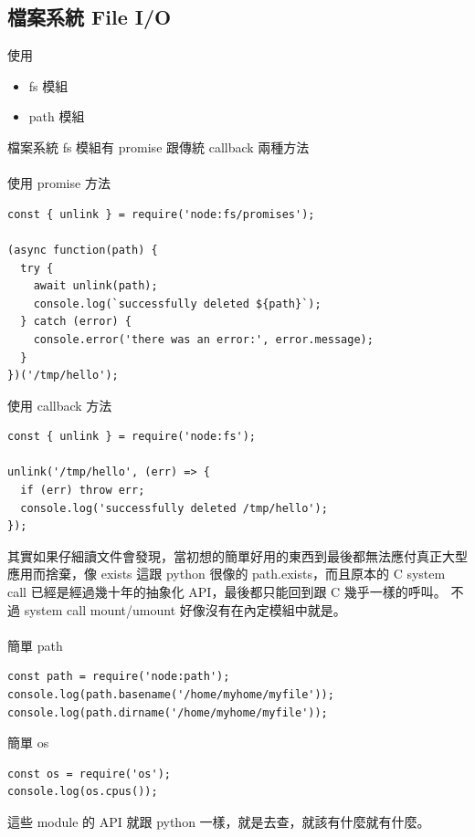   \subsection{檔案系統 File I/O}
  使用
  \begin{itemize}
    \item fs 模組
    \item path 模組
  \end{itemize}
  檔案系統 fs 模組有 promise 跟傳統 callback 兩種方法
  \\\\
  使用 promise 方法
  \begin{verbatim}
const { unlink } = require('node:fs/promises');

(async function(path) {
  try {
    await unlink(path);
    console.log(`successfully deleted ${path}`);
  } catch (error) {
    console.error('there was an error:', error.message);
  }
})('/tmp/hello');
  \end{verbatim}
  使用 callback 方法
  \begin{verbatim}
const { unlink } = require('node:fs');

unlink('/tmp/hello', (err) => {
  if (err) throw err;
  console.log('successfully deleted /tmp/hello');
});
  \end{verbatim}
  其實如果仔細讀文件會發現，當初想的簡單好用的東西到最後都無法應付真正大型
  應用而捨棄，像 exists 這跟 python 很像的 path.exists，而且原本的 C system
  call 已經是經過幾十年的抽象化 API，最後都只能回到跟 C 幾乎一樣的呼叫。 不
  過 system call mount/umount 好像沒有在內定模組中就是。
  \\\\
  簡單 path
  \begin{verbatim}
const path = require('node:path'); 
console.log(path.basename('/home/myhome/myfile'));
console.log(path.dirname('/home/myhome/myfile'));
  \end{verbatim}
  簡單 os
  \begin{verbatim}
const os = require('os');
console.log(os.cpus());
  \end{verbatim}
  這些 module 的 API 就跟 python 一樣，就是去查，就該有什麼就有什麼。

